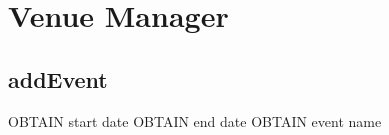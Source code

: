 \section{Venue Manager}

\subsection{addEvent}
\begin{pc}
OBTAIN start date
OBTAIN end date
OBTAIN event name
\end{pc}

\subsection{}
\begin{pc}
\end{pc}

\subsection{}
\begin{pc}
\end{pc}

\subsection{}
\begin{pc}
\end{pc}
